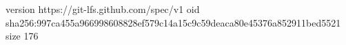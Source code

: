 version https://git-lfs.github.com/spec/v1
oid sha256:997ca455a966998608828ef579c14a15c9c59deaca80e45376a852911bed5521
size 176

